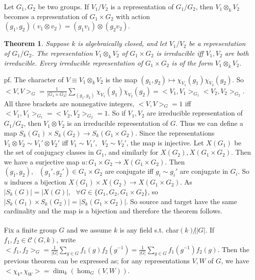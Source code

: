 \documentclass[12pt,letterpaper]{report}
\newtheorem{theorem}{Theorem}[section]
\begin{document}
Let $G_{1},G_{2}$ be two groups. If $V_{1}/V_{2}$ is a representation of $G_{1}/G_{2}$, then $V_{1}\otimes_{k}V_{2}$ becomes a representation of $G_{1}\times G_{2}$ with action $(g_{1},g_{2})(v_{1}\otimes v_{2})=(g_{1}v_{1})\otimes(g_{2}v_{2})$. 
\begin{theorem}Suppose $k$ is algebraically closed, and let $V_{1}/V_{2}$ be a representation of $G_{1}/G_{2}$. The representation $V_{1}\otimes_{k}V_{2}$ of $G_{1}\times G_{2}$ is irreducible iff $V_{1},V_{2}$ are both irreducible. Every irreducible representation of $G_{1}\times G_{2}$ is of the form $V_{1}\otimes_{k}V_{2}$.\end{theorem}
pf. The character of $V\equiv V_{1}\otimes_{k}V_{2}$ is the map $(g_{1},g_{2})\mapsto\chi_{V_{1}}(g_{1})\chi_{V_{2}}(g_{2})$. So $<V,V>_{G}=\frac{1}{|G_{1}\times G_{2}|}\sum_{(g_{1},g_{2})}\chi_{V_{1}}(g_{1})\chi_{V_{2}}(g_{2})=<V_{1},V_{1}>_{G_{1}}<V_{2},V_{2}>_{G_{2}}$. All three brackets are nonnegative integers, $<V,V>_{G}=1$ iff $<V_{1},V_{1}>_{G_{1}}=<V_{2},V_{2}>_{G_{2}}=1$. So if $V_{1},V_{2}$ are irreducible representation of $G_{1}/G_{2}$, then $V_{1}\otimes V_{2}$ is an irreducible representation of $G$. Thus we can define a map $S_{k}(G_{1})\times S_{k}(G_{2})\rightarrow S_{k}(G_{1}\times G_{2})$. Since the representations $V_{1}\otimes V_{2}\sim V_{1}'\otimes V_{2}'$ iff $V_{1}\sim V_{1}',\,\,\,V_{2}\sim V_{2}'$, the map is injective. Let $X(G_{1})$ be the set of conjugacy classes in $G_{1}$, and similarly for $X(G_{2}),X(G_{1}\times G_{2})$. Then we have a surjective map $u:G_{1}\times G_{2}\rightarrow X(G_{1}\times G_{2})$. Then $(g_{1},g_{2}),\,\,\,\,(g_{1}',g_{2}')\in G_{1}\times G_{2}$ are conjugate iff $g_{i}\sim g_{i}'$ are conjugate in $G_{i}$. So $u$ induces a bijection $X(G_{1})\times X(G_{2})\rightarrow X(G_{1}\times G_{2})$. As $|S_{k}(G)|=|X(G)|,\,\,\,\,\forall G\in\{G_{1},G_{2},G_{1}\times G_{2}\}$, so $|S_{k}(G_{1})\times S_{k}(G_{2})|=|S_{k}(G_{1}\times G_{2})|$. So source and target have the same cardinality and the map is a bijection and therefore the theorem follows. 
\\\\\indent Fix a finite group $G$ and we assume $k$ is any field s.t. char$(k)\not||G|$. If $f_{1},f_{2}\in\mathcal{C}(G,k)$, write $<f_{1},f_{2}>_{G}=\frac{1}{|G|}\sum_{g\in G}f_{1}(g)f_{2}(g^{-1})=\frac{1}{|G|}\sum_{g\in G}f_{1}(g^{-1})f_{2}(g)$. Then the previous theorem can be expressed as; for any representations $V,W$ of $G$, we have $<\chi_{V},\chi_{W}>=\dim_{k}(\hom_{G}(V,W))$. 
\end{document}
